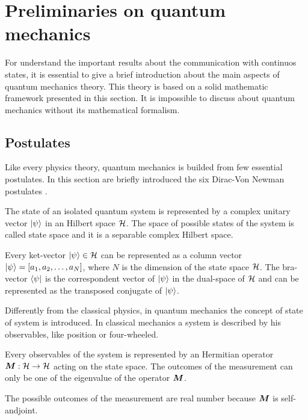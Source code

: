 \section{Preliminaries on quantum mechanics}
    For understand the important results about the communication with continuos
    states, it is essential to give a brief introduction about the main aspects 
    of quantum mechanics theory.
    This theory is based on a solid mathematic framework presented in this section.
    It is impossible to discuss about quantum mechanics without its mathematical 
    formalism.
    
    \subsection{Postulates}
    Like every physics theory, quantum mechanics is builded from few 
    essential postulates.
    In this section are briefly introduced the six Dirac-Von Newman 
    postulates \cite{quantumMec_Dirac,quantumMec_Neumann}.

    \begin{postulate}
        The state of an isolated quantum system is represented by a complex unitary 
        vector $\ket{\psi}$ in an Hilbert space $\mathcal{H}$.
        The space of possible states of the system is called state space and it is a
        separable complex Hilbert space.
        \label{post:1}
    \end{postulate}
    Every ket-vector $\ket{\psi} \in \mathcal{H}$ can be represented as a column vector 
    $\ket{\psi}=\left[ a_1,a_2,\dots,a_N \right]$, where $N$ is the dimension of the 
    state space $\mathcal{H}$. The bra-vector $\bra{\psi}$ is the correspondent vector of
    $\ket{\psi}$ in the dual-space of $\mathcal{H}$ and can be represented as the 
    transposed conjugate of $\ket{\psi}$.

    Differently from the classical physics, in quantum mechanics the concept
    of state of system is introduced. In classical mechanics a system is 
    described by his observables, like position or four-wheeled.
    
    \begin{postulate}[Observables]
        Every observables of the system is represented by an Hermitian operator 
        $\bm{\relax{M}}:\mathcal{H}\to\mathcal{H}$ acting on the state space.
        The outcomes of the measurement can only be one of the eigenvalue of the 
        operator $\bm{\relax{M}}$.
        \label{post:2}
    \end{postulate}
    The possible outcomes of the measurement are real number because $\bm{\relax{M}}$
    is self-andjoint. 

